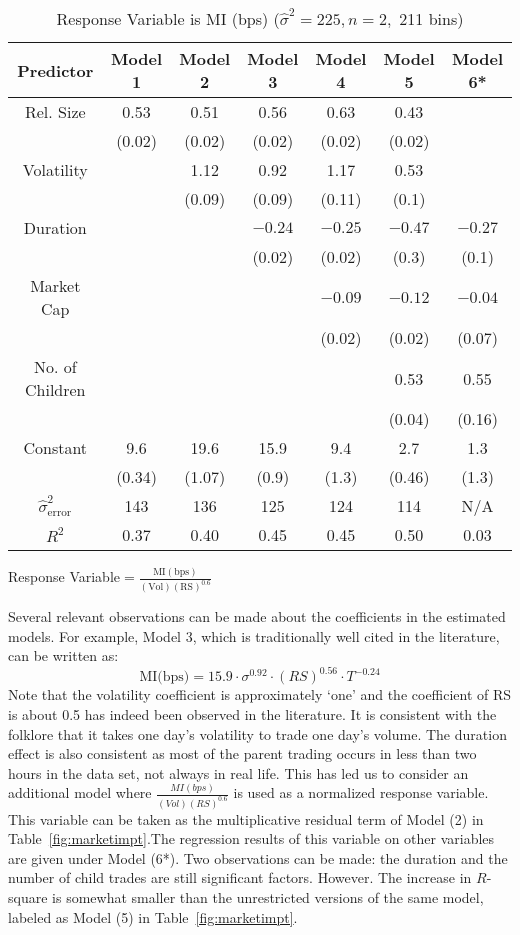 \begin{table}[!ht]
\caption{Response Variable is MI (bps) ($\hat{\sigma}^2=225, n=2,$ 211 bins)}
\begin{tabular}{|c|c|c|c|c|c|c|}
Predictor & Model 1& Model 2 & Model 3 & Model 4 & Model 5 & Model 6* \\ \hline
Rel. Size & 0.53 & 0.51 & 0.56 & 0.63 & 0.43 & \\
	& (0.02) & (0.02) & (0.02) & (0.02) & (0.02) & \\
Volatility & & 1.12 & 0.92 & 1.17 & 0.53 & \\
	& & (0.09) & (0.09) & (0.11) & (0.1) & \\
Duration	& & & $-0.24$ & $-0.25$ & $-0.47$ & $-0.27$ \\
	& & & (0.02) & (0.02) & (0.3) & (0.1) \\
Market Cap & & & & $-0.09$ & $-0.12$ & $-0.04$ \\
	& & & & (0.02) & (0.02) & (0.07) \\
No. of Children & & & & & 0.53 & 0.55 \\
	& & & & & (0.04) & (0.16) \\
Constant & 9.6 & 19.6 & 15.9 & 9.4 & 2.7 & 1.3 \\
	& (0.34) & (1.07) & (0.9) & (1.3) & (0.46) & (1.3) \\
\hline
$\hat{\sigma}_{\text{error}}^2$ & 143 & 136 & 125 & 124 & 114 & N/A \\
$R^2$ & 0.37 & 0.40 & 0.45 & 0.45 & 0.50 & 0.03 \\
\end{tabular}
\small*Response Variable$ = \frac{\text{MI}(\text{bps})}{(\text{Vol})(\text{RS})^0.6}$\normalsize
\end{table}


Several relevant observations can be made about the coefficients in the estimated models. For example, Model 3, which is traditionally well cited in the literature, can be written as:
	\[
	\text{MI(bps)}= 15.9\cdot\sigma^{0.92}\cdot(RS)^{0.56}\cdot T^{-0.24}
	\]
Note that the volatility coefficient is approximately `one' and the coefficient of RS is about 0.5 has indeed been observed in the literature. It is consistent with the folklore that it takes one day's volatility to trade one day's volume. The duration effect is also consistent as most of the parent trading occurs in less than two hours in the data set, not always in real life. This has led us to consider an additional model where $\frac{MI(bps)}{(Vol)(RS)^{0.6}}$ is used as a normalized response variable. This variable can be taken as the multiplicative residual term of  Model (2) in Table~\ref{fig:marketimpt}.The regression results of this variable on other variables are given under Model (6*). Two observations can be made: the duration and the number of child trades are still significant factors. However. The increase in $R$-square is somewhat smaller than the unrestricted versions of the same model, labeled as Model (5) in Table~\ref{fig:marketimpt}.


